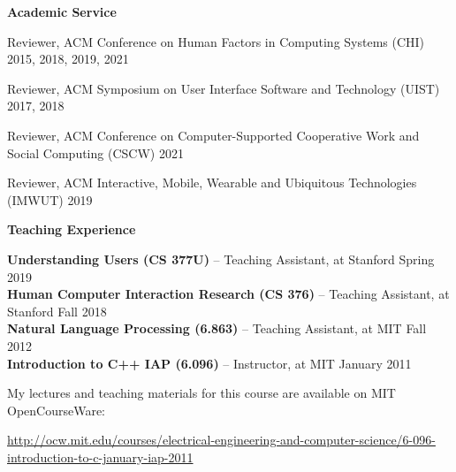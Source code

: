 \documentclass[10pt,A4]{article}
\newcommand{\cvsection}[1]
{
	\begin{center}
		\large\textcolor{sectcol}{\textbf{#1}}
	\end{center}
}
\begin{document}
\cvsection{Academic Service}

Reviewer, ACM Conference on Human Factors in Computing Systems (CHI) \hfill \textcolor{sectcol}{2015, 2018, 2019, 2021}

Reviewer, ACM Symposium on User Interface Software and Technology (UIST) \hfill \textcolor{sectcol}{2017, 2018}

Reviewer, ACM Conference on Computer-Supported Cooperative Work and Social Computing (CSCW) \hfill \textcolor{sectcol}{2021}

Reviewer, ACM Interactive, Mobile, Wearable and Ubiquitous Technologies (IMWUT) \hfill \textcolor{sectcol}{2019} \\



\cvsection{Teaching Experience}

\textbf{Understanding Users (CS 377U)} -- Teaching Assistant, at Stanford \hfill \textcolor{sectcol}{Spring 2019} \\

\textbf{Human Computer Interaction Research (CS 376)} -- Teaching Assistant, at Stanford \hfill \textcolor{sectcol}{Fall 2018} \\

\textbf{Natural Language Processing (6.863)} -- Teaching Assistant, at MIT \hfill \textcolor{sectcol}{Fall 2012} \\

\textbf{Introduction to C++ IAP (6.096)} -- Instructor, at MIT \hfill \textcolor{sectcol}{January 2011}

My lectures and teaching materials for this course are available on MIT OpenCourseWare:

\begin{footnotesize}
\url{http://ocw.mit.edu/courses/electrical-engineering-and-computer-science/6-096-introduction-to-c-january-iap-2011}
\end{footnotesize}\\
\end{document}

